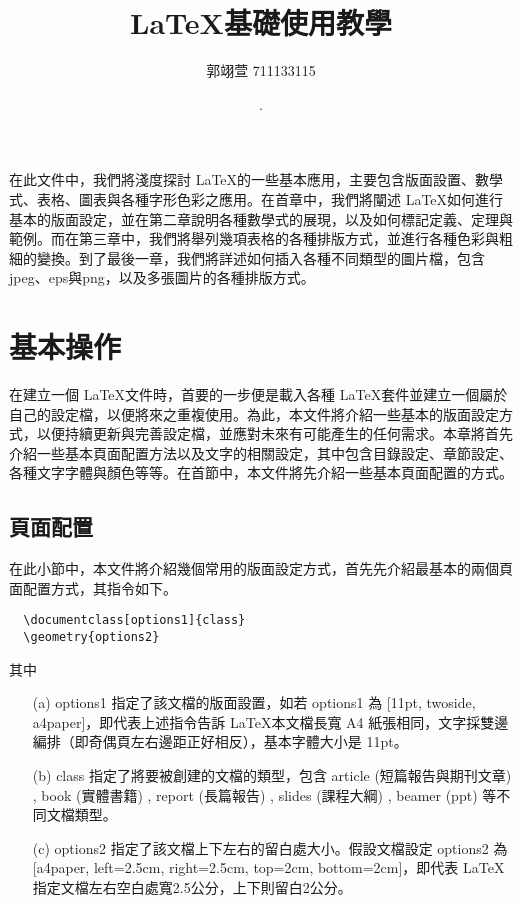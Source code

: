 \geometry{a4paper,left=2.5cm,right=2.5cm,top=2cm,bottom=2cm}
\usepackage{fancyhdr}
\pagestyle{fancy}
\fancyhf{}


\title{ \LaTeX {\MB 基礎使用教學}}	%
\author{{\BB 郭翊萱 711133115}}				%
\date{{. }} 			
 

\maketitle
\fontsize{12}{22pt}\selectfont 

在此文件中，我們將淺度探討 \LaTeX 的一些基本應用，主要包含版面設置、數學式、表格、圖表與各種字形色彩之應用。在首章中，我們將闡述 \LaTeX 如何進行基本的版面設定，並在第二章說明各種數學式的展現，以及如何標記定義、定理與範例。而在第三章中，我們將舉列幾項表格的各種排版方式，並進行各種色彩與粗細的變換。到了最後一章，我們將詳述如何插入各種不同類型的圖片檔，包含jpeg、eps與png，以及多張圖片的各種排版方式。

\section{基本操作}
在建立一個 \LaTeX 文件時，首要的一步便是載入各種 \LaTeX 套件並建立一個屬於自己的設定檔，以便將來之重複使用。為此，本文件將介紹一些基本的版面設定方式，以便持續更新與完善設定檔，並應對未來有可能產生的任何需求。本章將首先介紹一些基本頁面配置方法以及文字的相關設定，其中包含目錄設定、章節設定、各種文字字體與顏色等等。在首節中，本文件將先介紹一些基本頁面配置的方式。

\subsection{頁面配置}
在此小節中，本文件將介紹幾個常用的版面設定方式，首先先介紹最基本的兩個頁面配置方式，其指令如下。
\bigskip
\begin{lstlisting}
  \documentclass[options1]{class}
  \geometry{options2}
\end{lstlisting}


其中
\begin{itemize}
\item[(a)] options1 指定了該文檔的版面設置，如若 options1 為 [11pt, twoside, a4paper]，即代表上述指令告訴 \LaTeX 本文檔長寬 A4 紙張相同，文字採雙邊編排（即奇偶頁左右邊距正好相反），基本字體大小是 11pt。
\item[(b)] class 指定了將要被創建的文檔的類型，包含 article (短篇報告與期刊文章) , book (實體書籍) , report (長篇報告) , slides (課程大綱) , beamer (ppt) 等不同文檔類型。
\item[(c)] options2 指定了該文檔上下左右的留白處大小。假設文檔設定 options2 為 [a4paper, left=2.5cm, right=2.5cm, top=2cm, bottom=2cm]，即代表 \LaTeX 指定文檔左右空白處寬2.5公分，上下則留白2公分。
\end{itemize}

